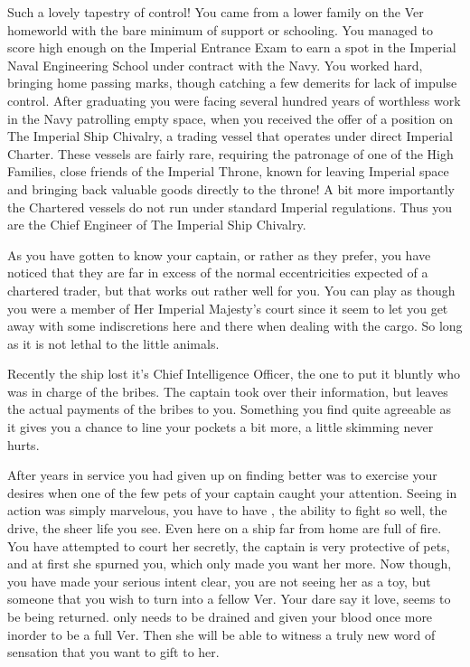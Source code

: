 \documentclass[char]{guildcamp4}
\begin{document}
\name{\cVtwo{}}


Such a lovely tapestry of control! 
You came from a lower family on the Ver homeworld with the bare minimum of support or schooling. You managed to score high enough
on the Imperial Entrance Exam to earn a spot in the Imperial Naval Engineering School under contract with the Navy. You worked
hard, bringing home passing marks, though catching a few demerits for lack of impulse control. After graduating you were facing 
several hundred years of worthless work in the Navy patrolling empty space, when you received the offer of a position on 
The Imperial Ship Chivalry, a trading vessel that operates under direct Imperial Charter. These vessels are fairly rare, requiring
the patronage of one of the High Families, close friends of the Imperial Throne, known for leaving Imperial space and bringing
back valuable goods directly to the throne! A bit more importantly the Chartered vessels do not run under standard Imperial regulations.
Thus you are the Chief Engineer of The Imperial Ship Chivalry. 

As you have gotten to know your captain, or rather \cVone{\Duke} as they prefer, you have noticed that they are far in excess of the normal eccentricities expected of a chartered trader, but that works out rather well for you. You can play as though you were a member of Her Imperial Majesty's court since it seem to let you get away with some indiscretions here and there when dealing with the cargo. So long as it is not lethal to the little animals. 

Recently the ship lost it's Chief Intelligence Officer, the one to put it bluntly who was in charge of the bribes. The captain took over their information, but leaves the actual payments of the bribes to you. Something you find quite agreeable as it gives you a chance to line your pockets a bit more, a little skimming never hurts.

After years in \cVone{\their} service you had given up on finding better was to exercise your desires when one of the few pets of your captain caught your attention. Seeing  \cJulie{} in action was simply marvelous, you have to have \cJulie{\them}, the ability to fight so well, the drive, the sheer life you see. Even here on a ship far from home \cJulie{\they} are full of fire. You have attempted to court her secretly, the captain is very protective of  pets, and at first she spurned you, which only made you want her more. Now though, you have made your serious intent clear, you are not seeing her as a toy, but someone that you wish to turn into a fellow Ver. Your dare say it love, seems to be being returned. \cJulie{} only needs to be drained and given your blood once more inorder to be a full Ver. Then she will be able to witness a truly new word of sensation that you want to gift to her.
\end{document}
